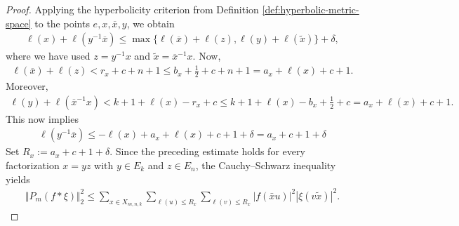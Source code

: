 \documentclass[10pt,a4paper]{amsart}
\begin{document}
\begin{proof}
    Applying the hyperbolicity criterion from Definition \ref{def:hyperbolic-metric-space} to the points $e, x, \overline{x}, y$, we obtain
    \begin{align*}
        \ell(x) + \ell(y^{-1}\overline{x}) \leq \max \{ \ell(\overline{x}) + \ell(z) , \ell(y) + \ell(\tilde{x}) \} + \delta, 
    \end{align*}
    where we have used $z = y^{-1}x$ and $\tilde{x} = \overline{x}^{-1}x$. Now,
    \begin{align*}
        \ell(\overline{x}) + \ell(z) < r_x + c  + n +1 \leq b_x + \frac{1}{2} + c + n+1 = a_x + \ell(x) + c + 1.
    \end{align*}
    Moreover,
    \begin{align*}
        \ell(y) + \ell(\overline{x}^{-1}x) < k+1 + \ell(x) - r_x +c \leq k+1 +\ell(x) -b_x + \frac{1}{2} +c  = a_x + \ell(x) +c + 1.
    \end{align*}
    This now implies
    \begin{align*}
        \ell(y^{-1}\overline{x}) \leq - \ell(x) + a_x + \ell(x) + c + 1 + \delta = a_x + c +1+\delta
    \end{align*}
    Set $R_x := a_x + c+ 1 +\delta$. 
    Since the preceding estimate holds for every factorization $x = yz$ with $y \in E_k$ and $z \in E_n$, the Cauchy--Schwarz inequality yields
    \begin{align*}
        \Vert P_m(f*\xi)\Vert_2^2
\leq
\sum_{x\in X_{m,n,k}}
\sum_{\ell(u)\leq R_x}
\sum_{\ell(v)\leq R_x}
|f(\bar xu)|^2|\xi(v\widetilde x)|^2.
    \end{align*}


\end{proof}
\end{document}
